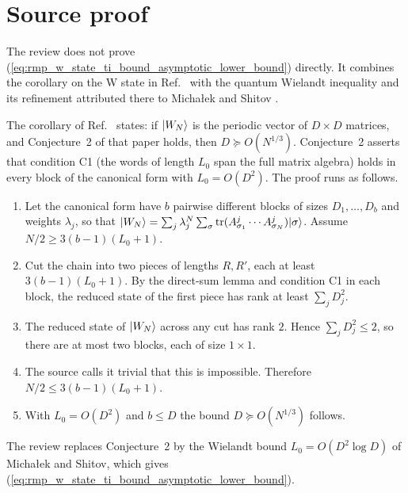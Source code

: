 \documentclass{article}
\begin{document}
\section{Source proof}

The review does not prove
(\ref{eq:rmp_w_state_ti_bound_asymptotic_lower_bound}) directly. It combines
the corollary on the W state in Ref.~\cite[lines~2182--2225]{PerezGarcia2007MPSReps}
with the quantum Wielandt inequality \cite{Sanz2010Quantum} and its refinement
attributed there to Micha\l{}ek and Shitov \cite[line~2362]{Cirac2021Matrix}.

The corollary of Ref.~\cite{PerezGarcia2007MPSReps} states: if $|W_N\rangle$ is
the periodic vector of $D\times D$ matrices, and Conjecture~2 of that paper
holds, then $D\succeq O(N^{1/3})$. Conjecture~2
\cite[lines~2109--2111]{PerezGarcia2007MPSReps} asserts that condition C1
(the words of length $L_0$ span the full matrix algebra) holds in every block
of the canonical form with $L_0=O(D^2)$. The proof runs as follows.
\begin{enumerate}
    \item Let the canonical form have $b$ pairwise different blocks of sizes
          $D_1,\ldots,D_b$ and weights $\lambda_j$, so that
          $|W_N\rangle=\sum_j\lambda_j^N\sum_\sigma
              \operatorname{tr}(A^j_{\sigma_1}\cdots A^j_{\sigma_N})|\sigma\rangle$.
          Assume $N/2\geq 3(b-1)(L_0+1)$.

    \item Cut the chain into two pieces of lengths $R,R'$, each at least
          $3(b-1)(L_0+1)$. By the direct-sum lemma
          \cite[lines~1346--1349]{PerezGarcia2007MPSReps} and condition C1 in each
          block, the reduced state of the first piece has rank at least
          $\sum_jD_j^2$.

    \item The reduced state of $|W_N\rangle$ across any cut has rank $2$.
          Hence $\sum_jD_j^2\leq 2$, so there are at most two blocks, each of size
          $1\times1$.

    \item The source calls it trivial that this is impossible. Therefore
          $N/2\leq 3(b-1)(L_0+1)$.

    \item With $L_0=O(D^2)$ and $b\leq D$ the bound $D\succeq O(N^{1/3})$
          follows.
\end{enumerate}
The review replaces Conjecture~2 by the Wielandt bound $L_0=O(D^2\log D)$ of
Micha\l{}ek and Shitov, which gives
(\ref{eq:rmp_w_state_ti_bound_asymptotic_lower_bound}).
\end{document}
